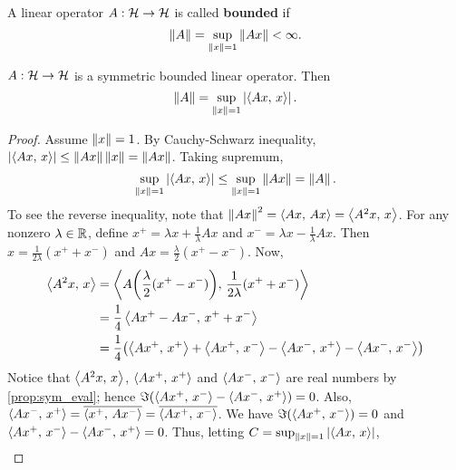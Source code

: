 \begin{definition}
    A linear operator $A:\mathcal{H}\to\mathcal{H}$ is called \textbf{bounded} if 
    \begin{equation*}
        \left\lVert {A} \right\rVert = \sup_{\left\lVert {x} \right\rVert=1}\left\lVert {Ax} \right\rVert < \infty.
    \end{equation*}
\end{definition}

\begin{proposition}
    $A:\mathcal{H}\to\mathcal{H}$ is a symmetric bounded linear operator. Then 
    \begin{equation*}
        \left\lVert {A} \right\rVert = \sup_{\left\lVert {x} \right\rVert = 1} \left\lvert {\left\langle {Ax},\, {x} \right\rangle} \right\rvert.
    \end{equation*}
\end{proposition}
\begin{proof}
    Assume $\left\lVert {x} \right\rVert = 1$. By Cauchy-Schwarz inequality, $\left\lvert {\left\langle {Ax},\, {x} \right\rangle} \right\rvert 
    \leq \left\lVert {Ax} \right\rVert\left\lVert {x} \right\rVert = \left\lVert {Ax} \right\rVert$. Taking supremum, 
    \begin{equation*}
        \sup_{\left\lVert {x} \right\rVert = 1}\left\lvert {\left\langle {Ax},\, {x} \right\rangle} \right\rvert \leq \sup_{\left\lVert {x} \right\rVert = 1}\left\lVert {Ax} \right\rVert 
        = \left\lVert {A} \right\rVert.
    \end{equation*}
    To see the reverse inequality, note that $\left\lVert {Ax} \right\rVert^2 = \left\langle {Ax},\, {Ax} \right\rangle 
    = \left\langle {A^2x},\, {x} \right\rangle$. For any nonzero $\lambda\in\mathbb{R}$, define $x^+ 
    = \lambda x + \frac{1}{\lambda}Ax$ and $x^- = \lambda x - \frac{1}{\lambda}Ax$. 
    Then $x = \frac{1}{2\lambda}(x^++x^-)$ and $Ax = \frac{\lambda}{2}(x^+-x^-)$. 
    Now, 
    \begin{equation*}
        \begin{split}
            \inp{A^2x}{x} &= \inp{A\pth{\frac{\lambda}{2}(x^+-x^-)}}{\frac{1}{2\lambda}(x^++x^-)} \\
            &= \frac{1}{4}\inp{Ax^+-Ax^-}{x^++x^-} \\ 
            &= \frac{1}{4}\pth{\inp{Ax^+}{x^+} + \inp{Ax^+}{x^-} - \inp{Ax^-}{x^+} - \inp{Ax^-}{x^-}} 
        \end{split}
    \end{equation*}
    Notice that $\left\langle {A^2x},\, {x} \right\rangle$, $\left\langle {Ax^+},\, {x^+} \right\rangle$ and $\left\langle {Ax^-},\, {x^-} \right\rangle$ are 
    real numbers by \cref{prop:sym_eval}; hence 
    $\Im\pth{\inp{Ax^+}{x^-} - \inp{Ax^-}{x^+}} = 0$. Also, $\left\langle {Ax^-},\, {x^+} \right\rangle 
    = \overline{\left\langle {x^+},\, {Ax^-} \right\rangle} = \overline{\left\langle {Ax^+},\, {x^-} \right\rangle}$. We have 
    $\Im\pth{\inp{Ax^+}{x^-}} = 0$ and $\left\langle {Ax^+},\, {x^-} \right\rangle - \left\langle {Ax^-},\, {x^+} \right\rangle = 0$. 
    Thus, letting $C = \sup_{\left\lVert {x} \right\rVert = 1}\left\lvert {\left\langle {Ax},\, {x} \right\rangle} \right\rvert$, 
    \begin{equation*}
        \begin{split}

\end{split}
\end{equation*}
\end{proof}
